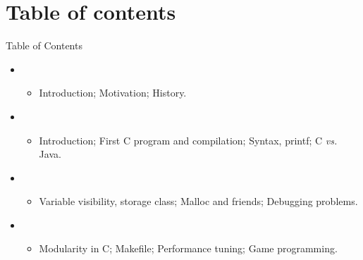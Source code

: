 \section{Table of contents}
\begin{frame}[squeeze]{Table of Contents}
  \begin{itemize}
  \item {}
    \begin{itemize}
    \item Introduction; Motivation; History.
    \end{itemize}
    \medskip
    \item {}
      \begin{itemize}
      \item Introduction; First C program and compilation; Syntax, printf; C
        \textit{vs.} Java.
      \end{itemize}
      
    \medskip
    \item {}
      \begin{itemize}
      \item Variable visibility, storage class; Malloc and friends; Debugging
        problems. 
      \end{itemize}
      
    \medskip
    \item {}
      \begin{itemize}
      \item Modularity in C; Makefile; Performance tuning; Game programming.
      \end{itemize}
    \end{itemize}
\end{frame}
